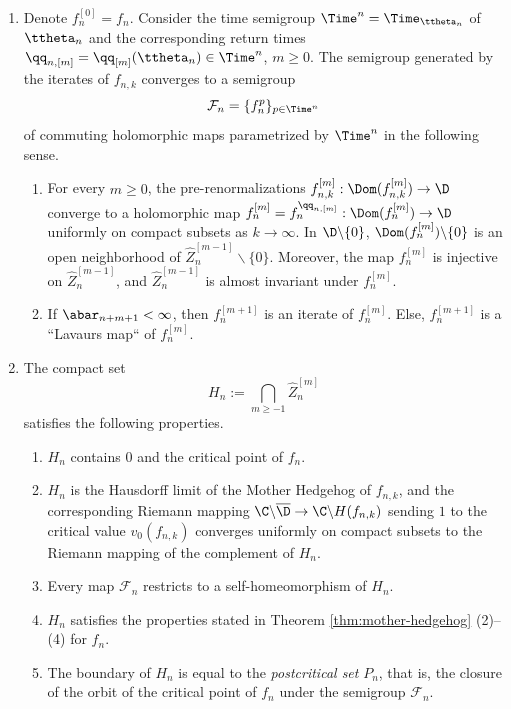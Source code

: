 \documentclass{amsart}
\begin{document}
\begin{theorem}
\begin{enumerate}[label = \textnormal{(\arabic*)}]
        \item Denote $f_n^{[0]} = f_n$. 
        Consider the time semigroup $\Time^n= \Time_{\ttheta_n}$ of $\ttheta_n$ and the corresponding return times $\qq_{n,[m]} = \qq_{[m]}(\ttheta_n) \in \Time^n$, $m \geq 0$. 
        The semigroup generated by the iterates of $f_{n,k}$ converges to a semigroup 
        \[
            \mathcal{F}_n = \{f_n^p \}_{p \in \Time^n}
        \]
        of commuting holomorphic maps parametrized by $\Time^n$ in the following sense.
        \begin{enumerate}[label = \textnormal{(\alph*)}]
            \item For every $m \geq 0$, the pre-renormalizations $f_{n,k}^{[m]}: \Dom(f_{n,k}^{[m]}) \to \D$ converge to a holomorphic map $f_n^{[m]} = f_n^{\qq_{n,[m]}}: \Dom(f_n^{[m]}) \to \D$ uniformly on compact subsets as $k \to \infty$. 
            In $\D \backslash \{0\}$, $\Dom(f_n^{[m]}) \backslash \{0\}$ is an open neighborhood of $\hat{Z}^{[m-1]}_n \backslash \{0\}$.
            Moreover, the map $f_n^{[m]}$ is injective on $\hat{Z}^{[m-1]}_n$, and $\hat{Z}^{[m-1]}_n$ is almost invariant under $f_n^{[m]}$. 
            \item If $\abar_{n+m+1} < \infty$, then $f_n^{[m+1]}$ is an iterate of $f_n^{[m]}$. 
            Else, $f_n^{[m+1]}$ is a ``Lavaurs map`` of $f_n^{[m]}$.
        \end{enumerate}
        
        \item The compact set
        \[
            H_n := \bigcap_{ m \geq -1} \hat{Z}^{[m]}_n
        \]
        satisfies the following properties.
        \begin{enumerate}[label = \textnormal{(\alph*)}]
            \item $H_n$ contains $0$ and the critical point of $f_n$.
            \item $H_n$ is the Hausdorff limit of the Mother Hedgehog of $f_{n,k}$, and the corresponding Riemann mapping $\C \backslash \overline{\D} \to \C \backslash H(f_{n,k})$ sending $1$ to the critical value $v_0(f_{n,k})$ converges uniformly on compact subsets to the Riemann mapping of the complement of $H_n$.
            \item Every map $\mathcal{F}_n$ restricts to a self-homeomorphism of $H_n$.
            \item $H_n$ satisfies the properties stated in Theorem \ref{thm:mother-hedgehog} (2)--(4) for $f_n$.
            \item The boundary of $H_n$ is equal to the \emph{postcritical set} $P_n$, that is, the closure of the orbit of the critical point of $f_n$ under the semigroup $\mathcal{F}_n$.
        \end{enumerate}


\end{enumerate}
\end{theorem}
\end{document}
